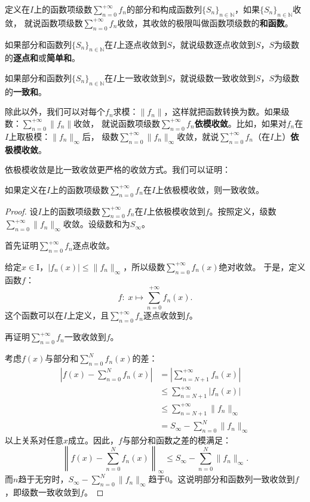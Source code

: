 \documentclass[12pt,UTF8,fontset=none]{ctexbook}
\begin{document}
\begin{appendix}
定义在$I$上的函数项级数$\sum_{n=0}^{+\infty} f_n$的部分和构成函数列$\{S_n\}_{n\in\mathbb{N}}$，如果$\{S_n\}_{n\in\mathbb{N}}$收敛，
就说函数项级数$\sum_{n=0}^{+\infty} f_n$收敛，其收敛的极限叫做函数项级数的\textbf{和函数}。

如果部分和函数列$\{S_n\}_{n\in\mathbb{N}}$在$I$上逐点收敛到$S$，就说级数逐点收敛到$S$，$S$为级数的\textbf{逐点和}或\textbf{简单和}。

如果部分和函数列$\{S_n\}_{n\in\mathbb{N}}$在$I$上一致收敛到$S$，就说级数一致收敛到$S$，$S$为级数的\textbf{一致和}。

除此以外，我们可以对每个$f_n$求模：$\|f_n\|$，这样就把函数转换为数。如果级数：$\sum_{n=0}^{+\infty} \|f_n\|$收敛，
就说函数项级数$\sum_{n=0}^{+\infty} f_n$\textbf{依模收敛}。比如，如果对$f_n$在$I$上取极模：$\|f_n\|_{\infty}$后，
级数$\sum_{n=0}^{+\infty} \|f_n\|_{\infty}$收敛，就说$\sum_{n=0}^{+\infty} f_n$（在$I$上）\textbf{依极模收敛}。

依极模收敛是比一致收敛更严格的收敛方式。我们可以证明：
\begin{tm}
    如果定义在$I$上的函数项级数$\sum_{n=0}^{+\infty} f_n$在$I$上依极模收敛，则一致收敛。
\end{tm}

\begin{proof}
    设$I$上的函数项级数$\sum_{n=0}^{+\infty} f_n$在$I$上依极模收敛到$f$。按照定义，级数
    $\sum_{n=0}^{+\infty} \|f_n\|_{\infty}$收敛。设级数和为$S_{\infty}$。

    首先证明$\sum_{n=0}^{+\infty} f_n$逐点收敛。

    给定$x\in $I，$|f_n(x)| \leqslant \| f_n \|_{\infty}$，所以级数$\sum_{n=0}^{+\infty} f_n(x)$绝对收敛。
    于是，定义函数$f$：
    $$ f : \; x\mapsto \sum_{n=0}^{+\infty} f_n(x). $$
    这个函数可以在$I$上定义，且$\sum_{n=0}^{+\infty} f_n$逐点收敛到$f$。

    再证明$\sum_{n=0}^{+\infty} f_n$一致收敛到$f$。

    考虑$f(x)$与部分和$\sum_{n=0}^N f_n(x)$的差：
    \begin{align*}
        \left| f(x) - \sum_{n=0}^N f_n(x) \right| &= \left| \sum_{n=N+1}^{+\infty} f_n(x) \right| \\
        &\leqslant \sum_{n=N+1}^{+\infty} |f_n(x)| \\
        &\leqslant \sum_{n=N+1}^{+\infty} \|f_n\|_{\infty} \\
        &= S_{\infty} - \sum_{n=0}^N \|f_n\|_{\infty}
    \end{align*}
    以上关系对任意$x$成立。因此，$f$与部分和函数之差的模满足：
    $$ \left\| f(x) - \sum_{n=0}^N f_n(x) \right\|_{\infty} \leqslant S_{\infty} - \sum_{n=0}^N \|f_n\|_{\infty}. $$
    而$n$趋于无穷时，$S_{\infty} - \sum_{n=0}^N \|f_n\|_{\infty}$趋于$0$。这说明部分和函数列一致收敛到$f$，即级数一致收敛到$f$。


\end{proof}
\end{appendix}
\end{document}
